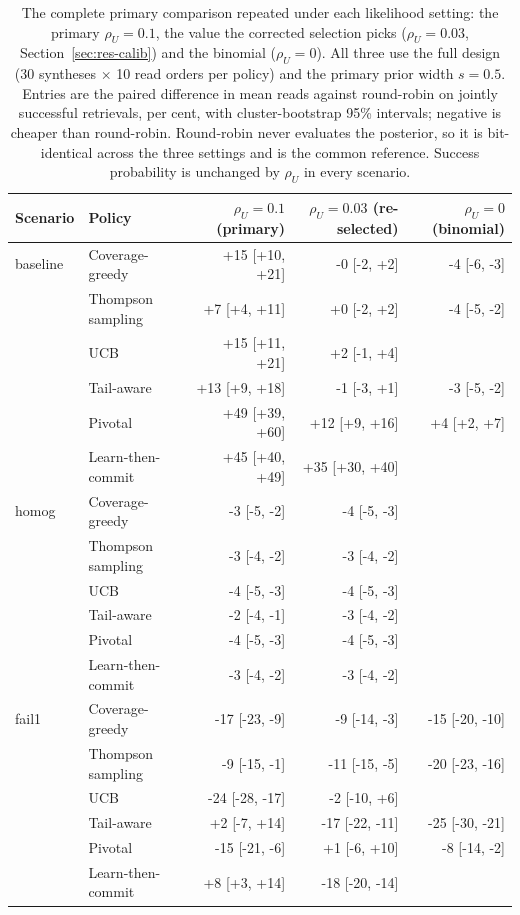 \begin{table}[!t]
\centering
\caption{The complete primary comparison repeated under each likelihood setting: the primary $\rho_U{=}0.1$, the value the corrected selection picks ($\rho_U{=}0.03$, Section~\ref{sec:res-calib}) and the binomial ($\rho_U{=}0$).  All three use the full design (30 syntheses $\times$ 10 read orders per policy) and the primary prior width $s{=}0.5$.  Entries are the paired difference in mean reads against round-robin on jointly successful retrievals, per cent, with cluster-bootstrap 95\% intervals; negative is cheaper than round-robin.  Round-robin never evaluates the posterior, so it is bit-identical across the three settings and is the common reference.  Success probability is unchanged by $\rho_U$ in every scenario.}
\label{tab:r6lik}
\scriptsize
\setlength{\tabcolsep}{4pt}
\begin{tabular}{@{}llrrr@{}}
\toprule
Scenario & Policy & $\rho_U{=}0.1$ (primary) & $\rho_U{=}0.03$ (re-selected) & $\rho_U{=}0$ (binomial) \\
\midrule
baseline & Coverage-greedy & +15 [+10, +21] & -0 [-2, +2] & -4 [-6, -3] \\
 & Thompson sampling & +7 [+4, +11] & +0 [-2, +2] & -4 [-5, -2] \\
 & UCB & +15 [+11, +21] & +2 [-1, +4] &  \\
 & Tail-aware & +13 [+9, +18] & -1 [-3, +1] & -3 [-5, -2] \\
 & Pivotal & +49 [+39, +60] & +12 [+9, +16] & +4 [+2, +7] \\
 & Learn-then-commit & +45 [+40, +49] & +35 [+30, +40] &  \\
\midrule
homog & Coverage-greedy & -3 [-5, -2] & -4 [-5, -3] &  \\
 & Thompson sampling & -3 [-4, -2] & -3 [-4, -2] &  \\
 & UCB & -4 [-5, -3] & -4 [-5, -3] &  \\
 & Tail-aware & -2 [-4, -1] & -3 [-4, -2] &  \\
 & Pivotal & -4 [-5, -3] & -4 [-5, -3] &  \\
 & Learn-then-commit & -3 [-4, -2] & -3 [-4, -2] &  \\
\midrule
fail1 & Coverage-greedy & -17 [-23, -9] & -9 [-14, -3] & -15 [-20, -10] \\
 & Thompson sampling & -9 [-15, -1] & -11 [-15, -5] & -20 [-23, -16] \\
 & UCB & -24 [-28, -17] & -2 [-10, +6] &  \\
 & Tail-aware & +2 [-7, +14] & -17 [-22, -11] & -25 [-30, -21] \\
 & Pivotal & -15 [-21, -6] & +1 [-6, +10] & -8 [-14, -2] \\
 & Learn-then-commit & +8 [+3, +14] & -18 [-20, -14] &  \\
\bottomrule
\end{tabular}
\end{table}

